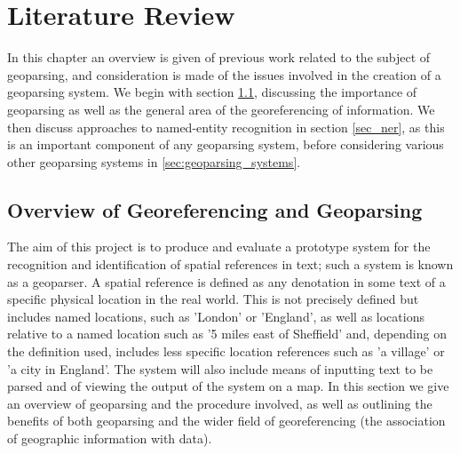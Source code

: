 \documentclass[12pt, a4paper]{report}
\begin{document}





\chapter{Literature Review}
\label{chap:lit_review}

In this chapter an overview is given of previous work related to the subject of geoparsing, and consideration is made of the issues involved in the creation of a geoparsing system. We begin with section \ref{sec:overview_georeferencing}, discussing the importance of geoparsing as well as the general area of the georeferencing of information. We then discuss approaches to named-entity recognition in section \ref{sec_ner}, as this is an important component of any geoparsing system, before considering various other geoparsing systems in \ref{sec:geoparsing_systems}.


\section{Overview of Georeferencing and Geoparsing}
\label{sec:overview_georeferencing}

The aim of this project is to produce and evaluate a prototype system for the recognition and identification of spatial references in text; such a system is known as a geoparser. A spatial reference is defined as any denotation in some text of a specific physical location in the real world. This is not precisely defined but includes named locations, such as 'London' or 'England', as well as locations relative to a named location such as '5 miles east of Sheffield' and, depending on the definition used, includes less specific location references such as 'a village' or 'a city in England'. The system will also include means of inputting text to be parsed and of viewing the output of the system on a map. In this section we give an overview of geoparsing and the procedure involved, as well as outlining the benefits of both geoparsing and the wider field of georeferencing (the association of geographic information with data). 
\end{document}
